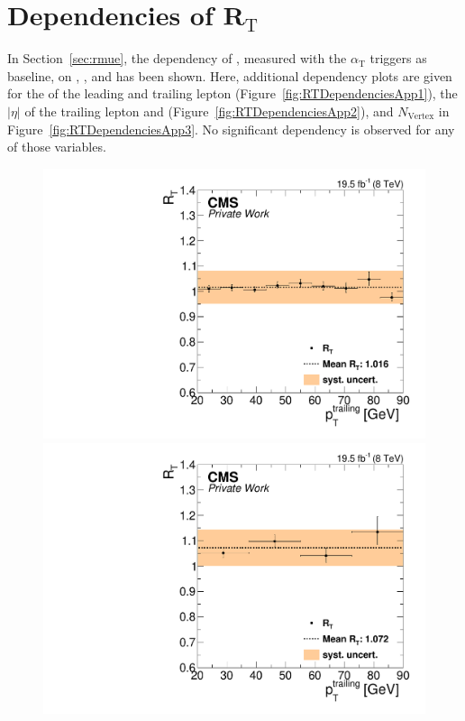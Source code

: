 \chapter{Dependencies of $\mathbf{R}_{\mathrm{T}}$}
\label{app:RT}
In Section~\ref{sec:rmue}, the dependency of \RT, measured with the $\alpha_{\mathrm{T}}$ triggers as baseline, on \mll, \njets, and \MET has been shown. Here, additional dependency plots are given for the \pt of the leading and trailing lepton (Figure~\ref{fig:RTDependenciesApp1}), the $|\eta|$ of the trailing lepton and \HT (Figure~\ref{fig:RTDependenciesApp2}), and $N_{\text{Vertex}}$ in Figure~\ref{fig:RTDependenciesApp3}. No significant dependency is observed for any of those variables.

\begin{figure}[htbp]
\centering
\begin{minipage}[t]{0.49\textwidth}
  \includegraphics[width=\textwidth]{plots/BG/trigger/Triggereff_SFvsOF_Syst_AlphaT_HighHTExclusiveCentral_Full2012_TrailingPt_leadingPt20.pdf}
\end{minipage}
\begin{minipage}[t]{0.49\textwidth}
\includegraphics[width=\textwidth]{plots/BG/trigger/Triggereff_SFvsOF_Syst_AlphaT_HighHTExclusiveForward_Full2012_TrailingPt_leadingPt20.pdf}

\end{minipage}
\end{figure}
